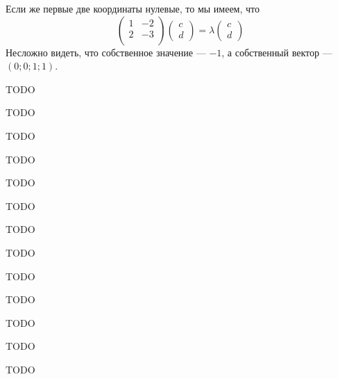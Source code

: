 \documentclass[12pt,a4paper]{article}
\begin{document}
\begin{enumproblem}
        Если же первые две координаты нулевые, то мы имеем, что
        \[
            \begin{pmatrix}
                1& -2\\
                2& -3\\
            \end{pmatrix}
            \begin{pmatrix}
                c\\
                d
            \end{pmatrix}
            =
            \lambda
            \begin{pmatrix}
                c\\
                d
            \end{pmatrix}
        \]
        Несложно видеть, что собственное значение --- $-1$, а собственный вектор --- $(0; 0; 1; 1)$.
    \end{enumproblem}

    \begin{enumproblem}
        TODO
    \end{enumproblem}

    \begin{enumproblem}
        TODO
    \end{enumproblem}

    \begin{enumproblem}
        TODO
    \end{enumproblem}

    \begin{enumproblem}
        TODO
    \end{enumproblem}

    \begin{enumproblem}
        TODO
    \end{enumproblem}

    \begin{enumproblem}
        TODO
    \end{enumproblem}

    \begin{enumproblem}
        TODO
    \end{enumproblem}

    \begin{enumproblem}
        TODO
    \end{enumproblem}

    \begin{enumproblem}
        TODO
    \end{enumproblem}

    \begin{enumproblem}
        TODO
    \end{enumproblem}

    \begin{enumproblem}
        TODO
    \end{enumproblem}

    \begin{enumproblem}
        TODO
    \end{enumproblem}

    \begin{enumproblem}
        TODO
    \end{enumproblem}
\end{document}
